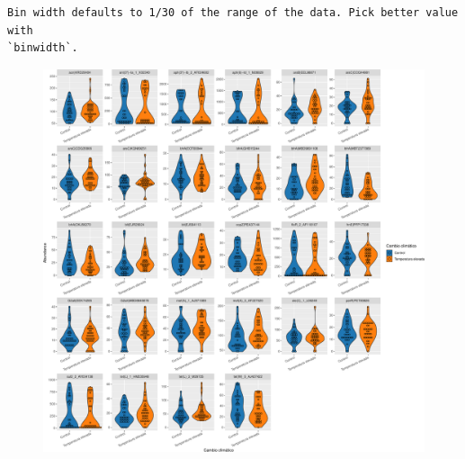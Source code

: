 \documentclass[
  letterpaper,
  DIV=11,
  numbers=noendperiod]{scrartcl}
\begin{document}
\begin{verbatim}
Bin width defaults to 1/30 of the range of the data. Pick better value with
`binwidth`.
\end{verbatim}

\begin{figure}[H]

{\centering \includegraphics{InformeNeiker_files/figure-pdf/unnamed-chunk-12-3.pdf}

}

\end{figure}
\end{document}
